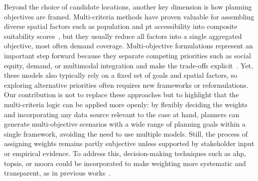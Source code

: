 Beyond the choice of candidate locations, another key dimension is how planning objectives are framed. Multi-criteria methods have proven valuable for assembling diverse spatial factors such as population and \ac{pt} accessibility into composite suitability scores~\cite{Kabak2018, Fazio2021, Veillette2018, Tera2023}, but they usually reduce all factors into a single aggregated objective, most often demand coverage. Multi-objective formulations represent an important step forward because they separate competing priorities such as social equity, demand, or multimodal integration and make the trade-offs explicit~\cite{Conrow2018, Duran-Rodas2021, Caggiani2020, Qian2022, Fan2024, Nikiforiadis2021}. Yet, these models also typically rely on a fixed set of goals and spatial factors, so exploring alternative priorities often requires new frameworks or reformulations. Our contribution is not to replace these approaches but to highlight that the multi-criteria logic can be applied more openly: by flexibly deciding the weights and incorporating any data source relevant to the case at hand, planners can generate multi-objective scenarios with a wide range of planning goals within a single framework, avoiding the need to use multiple models. Still, the process of assigning weights remains partly subjective unless supported by stakeholder input or empirical evidence. To address this, decision-making techniques such as \ac{ahp}, \ac{topsis}, or \ac{moora} could be incorporated to make weighting more systematic and transparent, as in previous works~\cite{Kabak2018, Guler2021a, Bahadori2022}.


